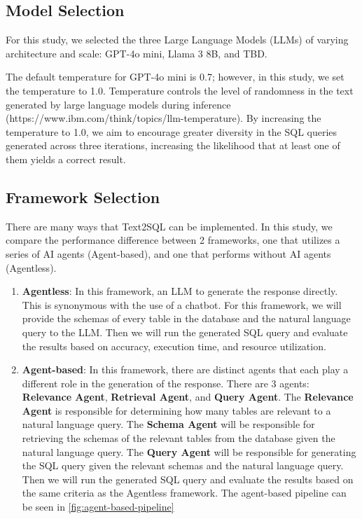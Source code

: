 \documentclass[10pt,twocolumn]{article}
\begin{document}
\subsection{Model Selection}

For this study, we selected the three Large Language Models (LLMs) of varying architecture and scale: GPT-4o mini, Llama 3 8B, and TBD.

The default temperature for GPT-4o mini is 0.7; however, in this study, we set the temperature to 1.0. Temperature controls the level of randomness in the text generated by large language models during inference (https://www.ibm.com/think/topics/llm-temperature). By increasing the temperature to 1.0, we aim to encourage greater diversity in the SQL queries generated across three iterations, increasing the likelihood that at least one of them yields a correct result.

\subsection{Framework Selection}

There are many ways that Text2SQL can be implemented. In this study, we compare the performance difference between 2 frameworks, one that utilizes a series of AI agents (Agent-based), and one that performs without AI agents (Agentless).
\begin{enumerate}
    \item \textbf{Agentless}: In this framework, an LLM to generate the response directly. This is synonymous with the use of a chatbot. For this framework, we will provide the schemas of every table in the database and the natural language query to the LLM. Then we will run the generated SQL query and evaluate the results based on accuracy, execution time, and resource utilization.
    
    \item \textbf{Agent-based}: In this framework, there are distinct agents that each play a different role in the generation of the response. There are 3 agents: \textbf{Relevance Agent}, \textbf{Retrieval Agent}, and \textbf{Query Agent}. The \textbf{Relevance Agent} is responsible for determining how many tables are relevant to a natural language query. The \textbf{Schema Agent} will be responsible for retrieving the schemas of the relevant tables from the database given the natural language query. The \textbf{Query Agent} will be responsible for generating the SQL query given the relevant schemas and the natural language query. Then we will run the generated SQL query and evaluate the results based on the same criteria as the Agentless framework. The agent-based pipeline can be seen in \ref{fig:agent-based-pipeline}

\end{enumerate}
\end{document}
